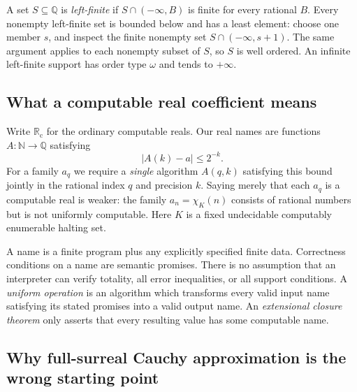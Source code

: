 \documentclass[11pt,letterpaper]{article}
\numberwithin{equation}{section}
\theoremstyle{definition}
\theoremstyle{remark}
\newcommand{\Rc}{\mathbb R_{\mathrm c}}
\newcommand{\Q}{\mathbb Q}
\newcommand{\N}{\mathbb N}
\begin{document}
A set $S\subseteq\Q$ is \emph{left-finite} if $S\cap(-\infty,B)$ is
finite for every rational $B$. Every nonempty left-finite set is bounded
below and has a least element: choose one member $s$, and inspect the finite
nonempty set $S\cap(-\infty,s+1)$. The same argument applies to each nonempty
subset of $S$, so $S$ is well ordered. An infinite left-finite support has
order type $\omega$ and tends to $+\infty$.

\subsection{What a computable real coefficient means}

Write $\Rc$ for the ordinary computable reals. Our real names are functions
$A:\N\to\Q$ satisfying
\begin{equation}\label{eq:cauchyname}
 |A(k)-a|\le 2^{-k}.
\end{equation}
For a family $a_q$ we require a \emph{single} algorithm $A(q,k)$ satisfying
this bound jointly in the rational index $q$ and precision $k$. Saying
merely that each $a_q$ is a computable real is weaker: the family
$a_n=\chi_K(n)$ consists of rational numbers but is not uniformly computable.
Here $K$ is a fixed undecidable computably enumerable halting set.

A name is a finite program plus any explicitly specified finite data.
Correctness conditions on a name are semantic promises. There is no
assumption that an interpreter can verify totality, all error inequalities,
or all support conditions. A \emph{uniform operation} is an algorithm which
transforms every valid input name satisfying its stated promises into a valid
output name. An \emph{extensional closure theorem} only asserts that every
resulting value has some computable name.

\subsection{Why full-surreal Cauchy approximation is the wrong starting point}
\end{document}
